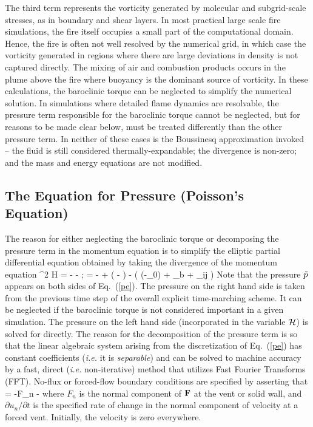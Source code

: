 \documentclass[11pt]{book}
\begin{document}
The third term represents the vorticity generated by molecular and subgrid-scale stresses, as in boundary and shear layers.
In most practical large scale fire simulations, the fire itself occupies a small part of
the computational domain. Hence, the fire is often not well resolved by
the numerical grid, in which case the vorticity generated in regions where there are
large deviations in density is not captured
directly. The mixing of air and combustion products occurs in the plume above the fire where
buoyancy is the dominant source of vorticity. In these calculations, the baroclinic torque
can be neglected to simplify the numerical solution. In simulations where detailed flame dynamics are
resolvable, the pressure term responsible for the baroclinic torque cannot be neglected, but for reasons
to be made clear below, must be treated differently than the other pressure term.
In neither of these cases is the Boussinesq approximation
invoked -- the fluid is still considered thermally-expandable; the divergence is non-zero; and the mass and
energy equations are not modified.

\subsection{The Equation for Pressure (Poisson's Equation)}

The reason for either neglecting the baroclinic torque or decomposing the pressure term in the
momentum equation is to simplify the
elliptic partial differential equation obtained by
taking the divergence of the momentum equation
\be \nabla^2 {\cal H} =
     - - \nabla \cdot \bF
    \quad ; \quad \bF = - \bu\times\bo + \left(  -
    \right) \nabla \tp - 
    \Big( (\rho-\rho_0) \bg + \bof_b + \nabla \cdot \btau_{ij} \Big)
   \label{pe}\ee
Note that the pressure $\tilde{p}$ appears on both sides of Eq.~(\ref{pe}). The
pressure on the right hand side is taken from the previous time step of the
overall explicit time-marching scheme. It can be neglected if the baroclinic torque is
not considered important in a given simulation. The pressure on the left hand side (incorporated
in the variable $\cal H$) is solved for directly.
The reason for the decomposition of the pressure term is so that the linear algebraic system
arising from the discretization of Eq.~(\ref{pe})
has constant coefficients ({\em i.e.} it is {\em separable}) and can be solved to machine accuracy
by a fast, direct ({\em i.e.} non-iterative) method that utilizes
Fast Fourier Transforms (FFT).
No-flux or forced-flow boundary conditions are specified by asserting that
\be {} = -F_n -  \label{bc} \ee
where $F_n$ is the normal component of ${\bf F}$ at the vent or solid wall,
and $\partial u_n/\partial t$ is the specified rate of change
in the normal component of
velocity at a forced vent. Initially, the velocity is zero everywhere.
\end{document}
